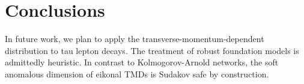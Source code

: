 \section{Conclusions}\label{sec:conclusions}

In future work, we plan to apply the transverse-momentum-dependent
distribution to tau lepton decays. The treatment of robust foundation
models is admittedly heuristic. In contrast to Kolmogorov-Arnold
networks, the soft anomalous dimension of eikonal TMDs is Sudakov safe
by construction.

